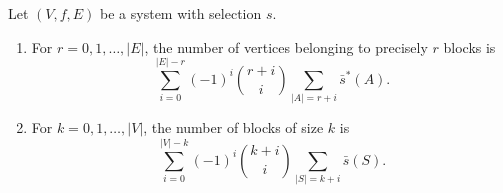 Let $(V, f, E)$ be a system with selection $s$.

\begin{enumerate}
\item[(a)] For $r = 0, 1, \ldots, |E|$, the number of vertices belonging to precisely $r$ blocks is
$$\sum_{i=0}^{|E|-r} (-1)^i \binom{r+i}{i} \sum_{|A|=r+i} \bar{s}^*(A).$$

\item[(b)] For $k = 0, 1, \ldots, |V|$, the number of blocks of size $k$ is
$$\sum_{i=0}^{|V|-k} (-1)^i \binom{k+i}{i} \sum_{|S|=k+i} \bar{s}(S).$$
\end{enumerate}
